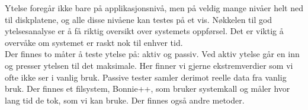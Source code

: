 \documentclass[a4paper, norsk, 12pt]{article}
\begin{document}
Ytelse foregår ikke bare på applikasjonsnivå, men på veldig mange nivåer helt ned til diskplatene, og alle disse nivåene kan testes på et vis. Nøkkelen til god ytelsesanalyse er å få riktig oversikt over systemets oppførsel. Det er viktig å overvåke om systemet er raskt nok til enhver tid.\\

Der finnes to måter å teste ytelse på: aktiv og passiv. Ved aktiv ytelse går en inn og presser ytelsen til det maksimale. Her finner vi gjerne ekstremverdier som vi ofte ikke ser i vanlig bruk. Passive tester samler derimot reelle data fra vanlig bruk. Der finnes et filsystem, Bonnie++, som bruker systemkall og måler hvor lang tid de tok, som vi kan bruke. Der finnes også andre metoder.


%

\end{document}
